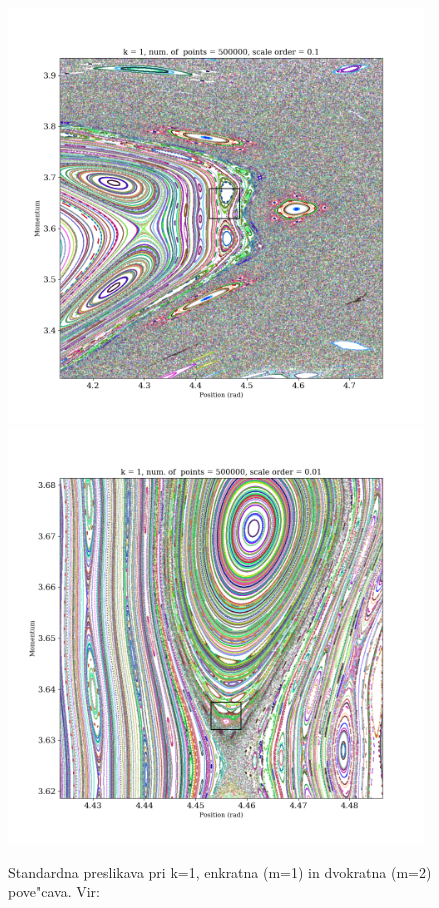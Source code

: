 \documentclass[]{article}
\begin{document}
\begin{figure}[!htb]
	\begin{center}
		\includegraphics[width = 11cm]{stdmap2}
		\includegraphics[width = 11cm]{stdmap3}
		\caption{Standardna preslikava pri k=1, enkratna (m=1) in dvokratna (m=2) pove"cava. Vir: \cite{1}}
		\label{slika 7}
	\end{center}
\end{figure}
\end{document}

